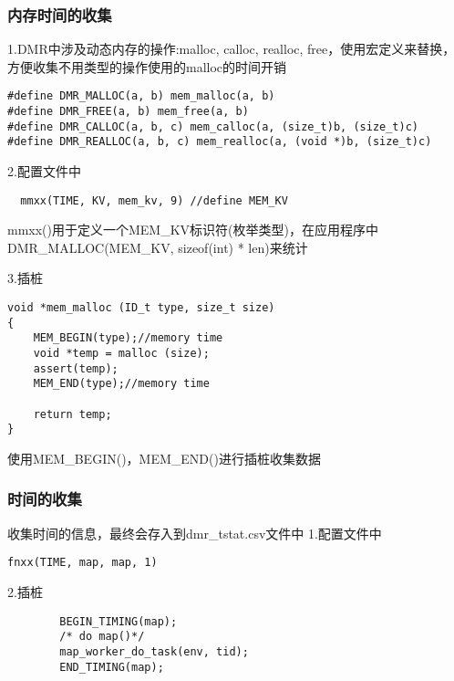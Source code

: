 \subsubsection{内存时间的收集}
1.DMR中涉及动态内存的操作:malloc, calloc, realloc, free，使用宏定义来替换，
方便收集不用类型的操作使用的malloc的时间开销
\begin{lstlisting}
#define DMR_MALLOC(a, b) mem_malloc(a, b)
#define DMR_FREE(a, b) mem_free(a, b)
#define DMR_CALLOC(a, b, c) mem_calloc(a, (size_t)b, (size_t)c)
#define DMR_REALLOC(a, b, c) mem_realloc(a, (void *)b, (size_t)c)
\end{lstlisting}

2.配置文件中
\begin{lstlisting}
  mmxx(TIME, KV, mem_kv, 9) //define MEM_KV
\end{lstlisting}
mmxx()用于定义一个MEM\_KV标识符(枚举类型)，在应用程序中DMR\_MALLOC(MEM\_KV, sizeof(int) * len)来统计

3.插桩
\begin{lstlisting}
void *mem_malloc (ID_t type, size_t size)
{
    MEM_BEGIN(type);//memory time
    void *temp = malloc (size);
    assert(temp);
    MEM_END(type);//memory time

    return temp;
}
\end{lstlisting}
使用MEM\_BEGIN()，MEM\_END()进行插桩收集数据

\subsubsection{时间的收集}
收集时间的信息，最终会存入到dmr\_tstat.csv文件中
1.配置文件中
\begin{lstlisting}
fnxx(TIME, map, map, 1)
\end{lstlisting}

2.插桩
\begin{lstlisting}
        BEGIN_TIMING(map);
        /* do map()*/ 
        map_worker_do_task(env, tid);
        END_TIMING(map);
\end{lstlisting}



